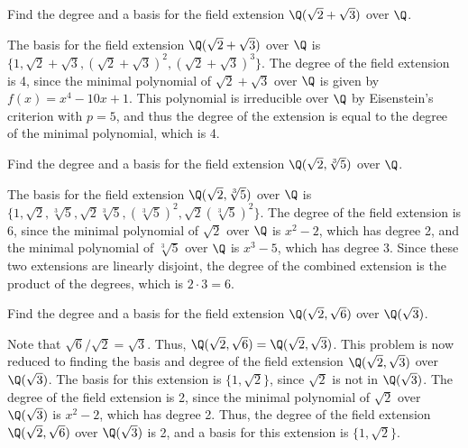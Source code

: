 \begin{problem}[40.6]
  Find the degree and a basis for the field extension $\Q(\sqrt{2} + \sqrt{3})$ over $\Q$.
\end{problem}

\begin{solution}
  The basis for the field extension $\Q(\sqrt{2} + \sqrt{3})$ over $\Q$ is $\{1, \sqrt{2} + \sqrt{3}, (\sqrt{2} + \sqrt{3})^2, (\sqrt{2} + \sqrt{3})^3\}$. The degree of the field extension is 4, since the minimal polynomial of $\sqrt{2} + \sqrt{3}$ over $\Q$ is given by $f(x) = x^4 - 10x + 1$. This polynomial is irreducible over $\Q$ by Eisenstein's criterion with $p = 5$, and thus the degree of the extension is equal to the degree of the minimal polynomial, which is 4.
\end{solution}

\begin{problem}[40.8]
  Find the degree and a basis for the field extension $\Q(\sqrt{2}, \sqrt[3]{5})$ over $\Q$.
\end{problem}

\begin{solution}
  The basis for the field extension $\Q(\sqrt{2}, \sqrt[3]{5})$ over $\Q$ is $\{1, \sqrt{2}, \sqrt[3]{5}, \sqrt{2}\sqrt[3]{5}, (\sqrt[3]{5})^2, \sqrt{2}(\sqrt[3]{5})^2\}$. The degree of the field extension is 6, since the minimal polynomial of $\sqrt{2}$ over $\Q$ is $x^2 - 2$, which has degree 2, and the minimal polynomial of $\sqrt[3]{5}$ over $\Q$ is $x^3 - 5$, which has degree 3. Since these two extensions are linearly disjoint, the degree of the combined extension is the product of the degrees, which is $2 \cdot 3 = 6$.
\end{solution}

\begin{problem}[40.10]
  Find the degree and a basis for the field extension $\Q(\sqrt{2}, \sqrt{6})$ over $\Q(\sqrt{3})$.
\end{problem}

\begin{solution}
  Note that $\sqrt{6}/\sqrt{2} = \sqrt{3}$. Thus, $\Q(\sqrt{2}, \sqrt{6}) = \Q(\sqrt{2}, \sqrt{3})$. This problem is now reduced to finding the basis and degree of the field extension $\Q(\sqrt{2}, \sqrt{3})$ over $\Q(\sqrt{3})$. The basis for this extension is $\{1, \sqrt{2}\}$, since $\sqrt{2}$ is not in $\Q(\sqrt{3})$. The degree of the field extension is 2, since the minimal polynomial of $\sqrt{2}$ over $\Q(\sqrt{3})$ is $x^2 - 2$, which has degree 2. Thus, the degree of the field extension $\Q(\sqrt{2}, \sqrt{6})$ over $\Q(\sqrt{3})$ is 2, and a basis for this extension is $\{1, \sqrt{2}\}$.
\end{solution}

